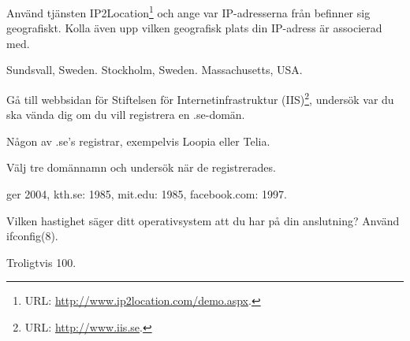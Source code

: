 \documentclass[a4paper,nocourse]{miunasgn}
\begin{document}
\begin{questions}
\begin{solution}
\end{solution}

\question
Använd tjänsten IP2Location\footnote{%
	URL: \url{http://www.ip2location.com/demo.aspx}.
} och ange var IP-adresserna från  befinner sig
geografiskt.
Kolla även upp vilken geografisk plats din IP-adress är associerad med.
\begin{solution}
	Sundsvall, Sweden. Stockholm, Sweden. Massachusetts, USA.
\end{solution}

\question
Gå till webbsidan för Stiftelsen för Internetinfrastruktur (IIS)\footnote{%
	URL: \url{http://www.iis.se}.
}, undersök var du ska vända dig om du vill registrera en .se-domän.
\begin{solution}
	Någon av .se's registrar, exempelvis Loopia eller Telia.
\end{solution}

\question
Välj tre domännamn och undersök när de registrerades.
\begin{solution}
	 ger 2004,
	kth.se: 1985,
	mit.edu: 1985,
	facebook.com: 1997.
\end{solution}



\question
Vilken hastighet säger ditt operativsystem att du har på din anslutning?
Använd ifconfig(8).
\begin{solution}
	Troligtvis \unit{100}{\mega\bit\per\second}.
\end{solution}


\end{questions}
\end{document}
